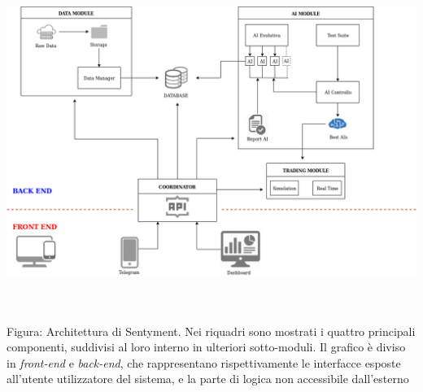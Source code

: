 \documentclass[a4paper,12pt]{report}
\begin{document}
	\begin{fig}
	\includegraphics[width=\linewidth]{Sentyment}
	\caption{\\~\\Figura: Architettura di Sentyment. Nei riquadri sono mostrati i quattro principali componenti, suddivisi al loro interno in ulteriori sotto-moduli. Il grafico è diviso in \textit{front-end} e \textit{back-end}, che rappresentano rispettivamente le interfacce esposte all'utente utilizzatore del sistema, e la parte di logica non accessibile dall'esterno}
\end{fig}
\\~\\
\end{document}
